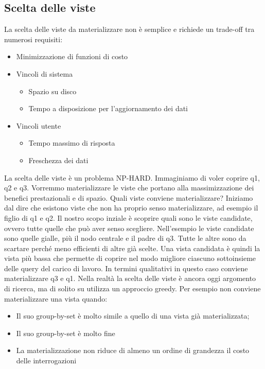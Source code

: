 \subsection{Scelta delle viste}
La scelta delle viste da materializzare non è semplice e richiede un trade-off tra numerosi requisiti:
\begin{itemize}
	\item Minimizzazione di funzioni di costo
	\item Vincoli di sistema
	\begin{itemize}
		\item Spazio su disco
		\item Tempo a disposizione per l'aggiornamento dei dati
	\end{itemize}
	\item Vincoli utente
	\begin{itemize}
		\item Tempo massimo di risposta
		\item Freschezza dei dati
	\end{itemize}
\end{itemize}
La scelta delle viste è un problema NP-HARD. Immaginiamo di voler coprire q1, q2 e q3. Vorremmo materializzare le viste che portano alla massimizzazione dei benefici prestazionali e di spazio. Quali viste conviene materializzare?
Iniziamo dal dire che esistono viste che non ha proprio senso materializzare, ad esempio il figlio di q1 e q2.\newline
Il nostro scopo inziale è scoprire quali sono le viste candidate, ovvero tutte quelle che può aver senso scegliere.\newline
Nell'esempio le viste candidate sono quelle gialle, più il nodo centrale e il padre di q3. Tutte le altre sono da scartare perché meno efficienti di altre già scelte.\newline
Una vista candidata è quindi la vista più bassa che permette di coprire nel modo migliore ciascuno sottoinsieme delle query del carico di lavoro.\newline
In termini qualitativi in questo caso conviene materializzare q3 e q1. Nella realtà la scelta delle viste è ancora oggi argomento di ricerca, ma di solito su utilizza un approccio greedy.
Per esempio non conviene materializzare una vista quando:
\begin{itemize}
	\item Il suo group-by-set è molto simile a quello di una vista già materializzata;
	\item Il suo group-by-set è molto fine
	\item La materializzazione non riduce di almeno un ordine di grandezza il costo delle interrogazioni
\end{itemize}
